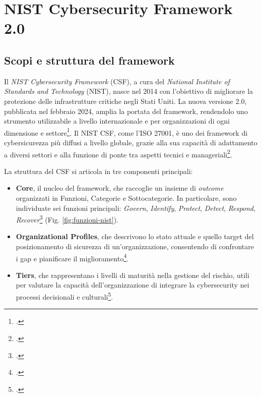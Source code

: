 \section{NIST Cybersecurity Framework 2.0}

\subsection{Scopi e struttura del framework}
Il \textit{NIST Cybersecurity Framework} (CSF), a cura del \textit{National Institute of Standards and Technology} (NIST), nasce nel 2014
con l’obiettivo di migliorare la protezione delle infrastrutture critiche negli Stati Uniti. La nuova versione 2.0, 
pubblicata nel febbraio 2024, amplia la portata del framework, rendendolo uno strumento utilizzabile a livello 
internazionale e per organizzazioni di ogni dimensione e settore\footcite[p. 1]{nist-csf}. Il NIST CSF, come l’ISO 27001, 
è uno dei framework di cybersicurezza più diffusi a livello globale, grazie alla sua capacità di adattamento a diversi settori 
e alla funzione di ponte tra aspetti tecnici e manageriali\footcite[p. 1]{mcintosh}.

La struttura del CSF si articola in tre componenti principali:
\begin{itemize}
    \item \textbf{Core}, il nucleo del framework, che raccoglie un insieme di \textit{outcome} organizzati in Funzioni, 
    Categorie e Sottocategorie. In particolare, sono individuate sei funzioni principali: 
    \textit{Govern}, \textit{Identify}, \textit{Protect}, \textit{Detect}, \textit{Respond}, \textit{Recover}\footcite[p. 5]{nist-csf} (Fig. \ref{fig:funzioni-nist}). 
    \item \textbf{Organizational Profiles}, che descrivono lo stato attuale e quello target del posizionamento di sicurezza 
    di un’organizzazione, consentendo di confrontare i gap e pianificare il miglioramento\footcite[p. 6]{nist-csf}.  
    \item \textbf{Tiers}, che rappresentano i livelli di maturità nella gestione del rischio, utili per 
    valutare la capacità dell’organizzazione di integrare la cybersecurity nei processi decisionali e culturali\footcite[p. 7]{nist-csf}.  
\end{itemize}


